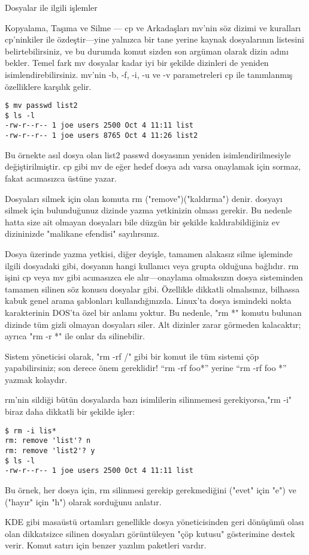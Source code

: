 \documentclass[10pt,a5paper]{book}
\begin{document}
\begin{section}{Dosyalar ile ilgili işlemler}
\begin{subsection}{Kopyalama, Taşıma ve Silme — cp ve Arkadaşları}
mv'nin söz dizimi ve kuralları cp'ninkiler ile özdeştir—yine yalnızca bir tane yerine kaynak dosyalarının listesini belirtebilirsiniz, ve bu durumda komut sizden son argüman olarak dizin adını bekler. Temel fark mv dosyalar kadar iyi bir şekilde dizinleri de yeniden isimlendirebilirsiniz.
mv'nin -b, -f, -i, -u ve -v parametreleri cp ile tanımlanmış özelliklere karşılık gelir.
\begin{verbatim}
$ mv passwd list2
$ ls -l
-rw-r--r-- 1 joe users 2500 Oct 4 11:11 list
-rw-r--r-- 1 joe users 8765 Oct 4 11:26 list2
\end{verbatim}
Bu örnekte asıl dosya olan list2 passwd dosyasının yeniden isimlendirilmesiyle değiştirilmiştir. cp gibi mv de eğer hedef dosya adı varsa onaylamak için sormaz, fakat acımasızca üstüne yazar.

Dosyaları silmek için olan komuta rm ("remove")("kaldırma") denir. dosyayı silmek için bulunduğunuz dizinde yazma yetkinizin olması gerekir. Bu nedenle hatta size ait olmayan dosyaları bile düzgün bir şekilde kaldırabildiğiniz ev dizininizde "malikane efendisi" sayılırsınız.

Dosya üzerinde yazma yetkisi, diğer deyişle, tamamen alakasız silme işleminde ilgili dosyadaki gibi, dosyanın hangi kullanıcı veya grupta olduğuna bağlıdır.
rm işini cp veya mv gibi acımasızca ele alır—onaylama olmaksızın dosya sisteminden tamamen silinen söz konusu dosyalar gibi. Özellikle dikkatli olmalısınız,  bilhassa kabuk genel arama şablonları kullandığınızda. Linux'ta dosya ismindeki nokta karakterinin DOS'ta özel bir anlamı yoktur. Bu nedenle, "rm *" komutu bulunan dizinde tüm gizli olmayan dosyaları siler. Alt dizinler zarar görmeden kalacaktır; ayrıca "rm -r *" ile onlar da silinebilir.

Sistem yöneticisi olarak, "rm -rf /" gibi bir komut ile tüm sistemi çöp yapabilirsiniz; son derece önem gereklidir!  “rm -rf foo*” yerine “rm -rf foo *” yazmak kolaydır.

rm'nin sildiği bütün dosyalarda bazı isimlilerin silinmemesi gerekiyorsa,"rm -i" biraz daha dikkatli bir şekilde işler:
\begin{verbatim}
$ rm -i lis*
rm: remove 'list'? n
rm: remove 'list2'? y
$ ls -l
-rw-r--r-- 1 joe users 2500 Oct 4 11:11 list
\end{verbatim}
Bu örnek, her dosya için, rm silinmesi gerekip gerekmediğini ("evet" için "e") ve ("hayır" için "h") olarak sorduğunu anlatır.

KDE gibi masaüstü ortamları genellikle dosya yöneticisinden geri dönüşümü olası olan dikkatsizce silinen dosyaları görüntüleyen "çöp kutusu" gösterimine destek verir. Komut satırı için benzer yazılım paketleri vardır.


\end{subsection}
\end{section}
\end{document}
